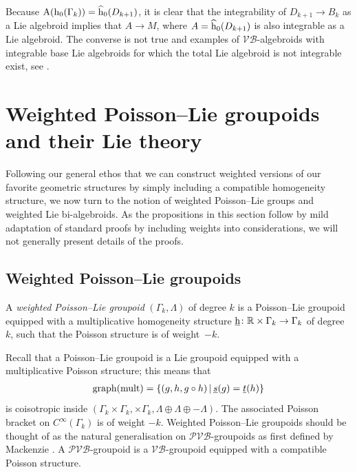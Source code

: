 \documentclass[10pt,a4paper]{amsart}
\newcommand{\rmh}{\textnormal{h}}
\numberwithin{equation}{section}
\begin{document}
Because $\textnormal{A}(\rmh_{0}(\Gamma_{k})) = \widehat{\rmh}_{0}(D_{k+1})$, it is clear that the integrability of $D_{k+1}\rightarrow B_{k}$ as a Lie algebroid implies that $A \rightarrow M$, where $A = \widehat{\rm h}_{0}(D_{k+1})$ is also integrable as a Lie algebroid.  The converse is not true and examples of $\mathcal{VB}$-algebroids with integrable base Lie algebroids for which the total Lie algebroid is not integrable exist, see \cite{Brahic:2014,Bursztyn:2014}.


\section{Weighted Poisson--Lie groupoids and their Lie theory}\label{sec:Weighted Poisson Groupoids}
Following our general ethos that we can construct weighted versions of our favorite geometric structures by simply including a compatible homogeneity structure, we now turn to the notion of weighted Poisson--Lie groups and weighted Lie bi-algebroids.  As the propositions in this section follow by mild adaptation of standard proofs by including weights into considerations, we will not generally present details of the proofs.

\subsection{Weighted Poisson--Lie groupoids}

\begin{Definition}
A \emph{weighted Poisson--Lie groupoid} $(\Gamma_{k}, \Lambda)$ of degree $k$ is a Poisson--Lie groupoid equipped with a multiplicative homogeneity structure $\underline{\rmh}\colon  \mathbb{R}\times \Gamma_{k} \rightarrow \Gamma_{k}$ of degree~$k$, such that the Poisson structure is of weight~${-}k$.
\end{Definition}



Recall that a Poisson--Lie groupoid is a Lie groupoid equipped with a multiplicative Poisson structure; this means that
\begin{gather*}
\textnormal{graph}(\textnormal{mult}) = \{(g,h,  g\circ h) \,| \, \underline{s}(g) = \underline{t}(h)  \}
\end{gather*}
 is coisotropic inside $ ( \Gamma_{k} \times \Gamma_{k}, \times \Gamma_{k}, \Lambda\oplus \Lambda \oplus {-}\Lambda )$.  The associated Poisson bracket on $C^{\infty}(\Gamma_{k})$ is of weight ${-}k$.
Weighted Poisson--Lie groupoids should be thought of as the natural generalisation on $\mathcal{PVB}$-groupoids as f\/irst def\/ined by Mackenzie \cite{Mackenzie:1999}. A  $\mathcal{PVB}$-groupoid is a $\mathcal{VB}$-groupoid equipped with a compatible Poisson structure.
\end{document}
